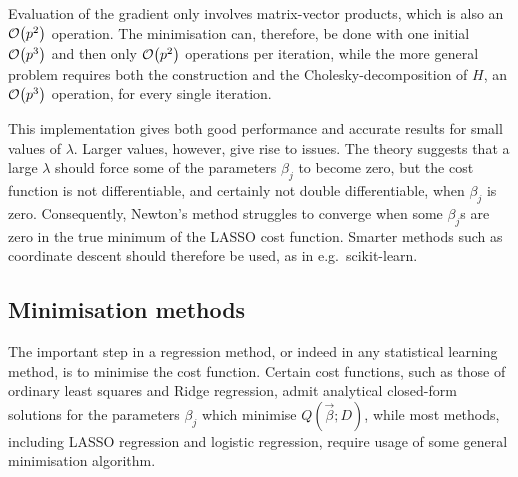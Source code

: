 \documentclass[11pt,british,a4paper]{article}
\numberwithin{equation}{section}
\begin{document}
Evaluation of the gradient only involves matrix-vector products, which is also an \(\mathcal{O}\qty(p^2)\) operation.
The minimisation can, therefore, be done with one initial \(\mathcal{O}\qty(p^3)\) and then only \(\mathcal{O}\qty(p^2)\) operations per iteration, while the more general problem requires both the construction and the Cholesky-decomposition of \(H\), an \(\mathcal{O}\qty(p^3)\) operation, for every single iteration.

This implementation gives both good performance and accurate results for small values of \(\lambda\).
Larger values, however, give rise to issues.
The theory suggests that a large \(\lambda\) should force some of the parameters \(\beta_j\) to become zero, but the cost function is not differentiable, and certainly not double differentiable, when \(\beta_j\) is zero.
Consequently, Newton's method struggles to converge when some \(\beta_j\)s are zero in the true minimum of the LASSO cost function.
Smarter methods such as coordinate descent\cite{friedman} should therefore be used, as in e.g.\ scikit-learn.


\subsection{Minimisation methods}\label{subsec:min}
The important step in a regression method, or indeed in any statistical learning method, is to minimise the cost function.
Certain cost functions, such as those of ordinary least squares and Ridge regression, admit analytical closed-form solutions for the parameters \(\beta_j\) which minimise \(Q(\vec{\beta};D)\), while most methods, including LASSO regression and logistic regression, require usage of some general minimisation algorithm.
\end{document}
